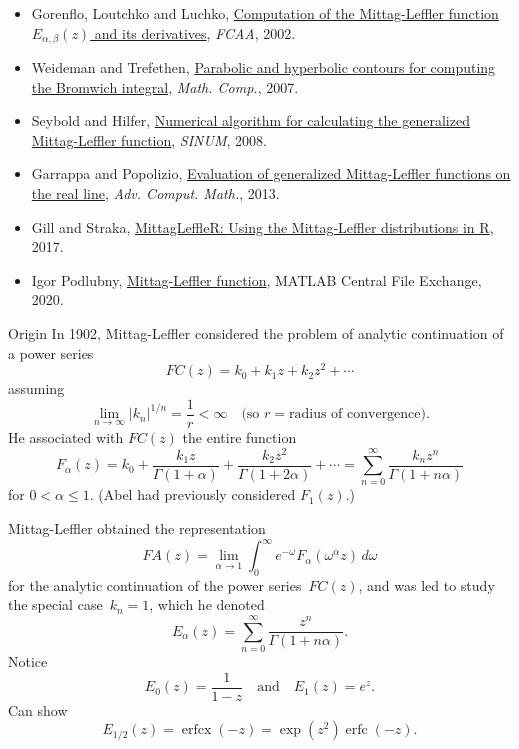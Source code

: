 \documentclass{beamer}
\begin{document}
\begin{frame}
\begin{itemize}
\item Gorenflo, Loutchko and Luchko, 
\href{http://citeseerx.ist.psu.edu/viewdoc/summary?doi=10.1.1.501.3682}%
{Computation of the Mittag-Leffler function $E_{\alpha,\beta}(z)$ and its 
derivatives}, \emph{FCAA}, 2002.
\item Weideman and Trefethen, 
\href{https://www.ams.org/journals/mcom/2007-76-259/S0025-5718-07-01945-X/}%
{Parabolic and hyperbolic contours for computing the Bromwich integral},
\emph{Math. Comp.}, 2007.
\item Seybold and Hilfer, 
\href{https://epubs.siam.org/doi/10.1137/070700280}%
{Numerical algorithm for calculating the generalized Mittag-Leffler function},
\emph{SINUM}, 2008.
\item Garrappa and Popolizio, 
\href{https://link.springer.com/article/10.1007/s10444-012-9274-z}%
{Evaluation of generalized Mittag-Leffler functions on the real line},
\emph{Adv. Comput. Math.}, 2013.
\item Gill and Straka, 
\href{https://strakaps.github.io/MittagLeffleR/}%
{MittagLeffleR: Using the Mittag-Leffler distributions in R}, 2017.
\item  Igor Podlubny,
\href{https://www.mathworks.com/matlabcentral/fileexchange/%
8738-mittag-leffler-function}%
{Mittag-Leffler function}, MATLAB Central File Exchange, 2020. 
\end{itemize}
\end{frame}
\begin{frame}{Origin}
In 1902, Mittag-Leffler considered the problem of analytic continuation of a
power series
\[
FC(z)=k_0+k_1z+k_2z^2+\cdots
\]
assuming
\[
\lim_{n\to\infty}|k_n|^{1/n}=\frac{1}{r}<\infty
\quad\text{(so $r=\text{radius of convergence}$).}
\]
He associated with $FC(z)$ the entire function
\[
F_\alpha(z)=k_0+\frac{k_1z}{\Gamma(1+\alpha)}+\frac{k_2z^2}{\Gamma(1+2\alpha)}
    +\cdots=\sum_{n=0}^\infty\frac{k_nz^n}{\Gamma(1+n\alpha)}
\]
for $0<\alpha\le1$.  (Abel had previously considered $F_1(z)$.)
\end{frame}
\begin{frame}
Mittag-Leffler obtained the representation
\[
FA(z)=\lim_{\alpha\to1}\int_0^\infty 
    e^{-\omega}F_\alpha(\omega^\alpha z)\,d\omega
\]
for the analytic continuation of the power series~$FC(z)$, and was led to study 
the special case~$k_n=1$, which he denoted
\[
E_\alpha(z)=\sum_{n=0}^\infty\frac{z^n}{\Gamma(1+n\alpha)}.
\]
Notice
\[
E_0(z)=\frac{1}{1-z}\quad\text{and}\quad
E_1(z)=e^z.
\]
Can show
\[
E_{1/2}(z)=\operatorname{erfcx}(-z)=\exp(z^2)\operatorname{erfc}(-z).
\]
\end{frame}
\end{document}
